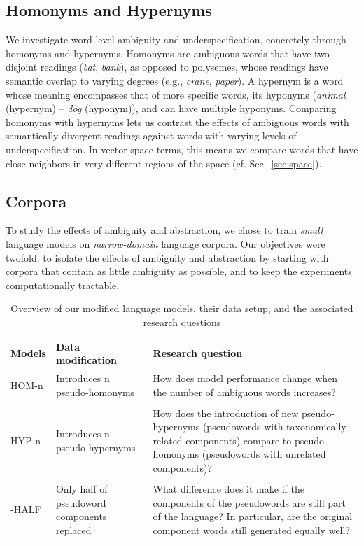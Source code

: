 \documentclass[final]{clv2025}
\begin{document}
 \subsection{Homonyms and Hypernyms} \label{sec:hypo}
We investigate word-level ambiguity and underspecification, concretely through homonyms and hypernyms. Homonyms are ambiguous words that have two disjoint readings (\emph{bat}, \emph{bank}), as opposed to polysemes, whose readings have semantic overlap to varying degrees (e.g., \emph{crane}, \emph{paper}). A hypernym is a word whose meaning encompasses that of more specific words, its hyponyms (\emph{animal} (hypernym) -- \emph{dog} (hyponym)), and can have multiple hyponyms.
Comparing homonyms with hypernyms lets us contrast the effects of ambiguous words with semantically divergent readings against words with varying levels of underspecification. In vector space terms, this means we compare words that have close neighbors in very different regions of the space (cf. Sec.~\ref{sec:space}).



\subsection{Corpora}\label{sec:corpora}
To study the effects of ambiguity and abstraction, we chose to train \emph{small} language models on \emph{narrow-domain} language corpora. Our objectives were twofold: to isolate the effects of ambiguity and abstraction by starting with corpora that contain as little ambiguity as possible, and to keep the experiments computationally tractable.
\begin{table}
\centering
\begin{tabular}{l p{34mm} p{94mm}}
\toprule
Models & Data modification & Research question \\
\midrule
HOM-{n} & Introduces n pseudo-homonyms & How does model performance change when the number of ambiguous words increases? \\ &&\\
HYP-{n} & Introduces n pseudo-hypernyms & How does the introduction of new pseudo-hypernyms (pseudowords with taxonomically related components) compare to pseudo-homonyms (pseudowords with unrelated components)? \\ &&\\
-HALF & Only half of pseudoword components replaced & What difference does it make if the components of the pseudowords are still part of the language? In particular, are the original component words still generated equally well? \\
\bottomrule
\end{tabular}
\caption{Overview of our modified language models, their data setup, and the associated research questions}\label{tab:experiments}
\end{table}
\end{document}
